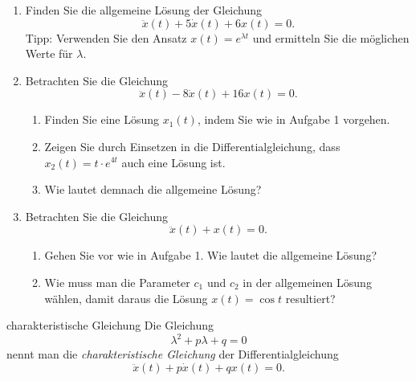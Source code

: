 \begin{LA}{}{}

    \begin{enumerate}
        \item Finden Sie die allgemeine Lösung der Gleichung
              \[
                  \ddot{x}(t)+5\dot{x}(t)+6x(t)=0.
              \]
              Tipp: Verwenden Sie den Ansatz \(x(t)=e^{\lambda t}\)
              und ermitteln Sie die möglichen Werte für \(\lambda\).
        \item Betrachten Sie die Gleichung
              \[
                  \ddot{x}(t)-8\dot{x}(t)+16x(t)=0.
              \]
              \begin{enumerate}
                  \item Finden Sie eine Lösung \(x_1(t)\), indem Sie
                        wie in Aufgabe 1 vorgehen.
                  \item Zeigen Sie durch Einsetzen in die Differentialgleichung,
                        dass \(x_2(t)=t\cdot e^{4t}\) auch eine Lösung ist.
                  \item Wie lautet demnach die allgemeine Lösung?
              \end{enumerate}
              \pagebreak
        \item Betrachten Sie die Gleichung
              \[
                  \ddot{x}(t)+x(t)=0.
              \]
              \begin{enumerate}
                  \item Gehen Sie vor wie in Aufgabe 1.
                        Wie lautet die allgemeine Lösung?
                  \item Wie muss man die Parameter \(c_1\) und \(c_2\)
                        in der allgemeinen Lösung wählen, damit daraus
                        die Lösung \(x(t)=\cos t\) resultiert?
              \end{enumerate}
    \end{enumerate}

\end{LA}








\pagebreak
\begin{definition}{charakteristische Gleichung}{}
    Die Gleichung
    \[
        \lambda^2+p\lambda+q=0
    \]
    nennt man die \emph{charakteristische Gleichung} der Differentialgleichung
    \[
        \ddot{x}(t)+p\dot{x}(t)+qx(t)=0.
    \]


\end{definition}

